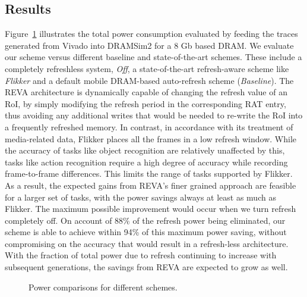 \subsection{Results}
Figure~\ref{fig:PowerResults} illustrates the total power consumption evaluated by feeding the traces generated from Vivado into DRAMSim2 for a 8 Gb based DRAM. We evaluate our scheme versus different baseline and state-of-the-art schemes. These include a completely refreshless system, \emph{Off}, a state-of-the-art refresh-aware scheme like \emph{Flikker} and a default mobile DRAM-based auto-refresh scheme (\emph{Baseline}). %
The REVA architecture is dynamically capable of changing the refresh value of an RoI, by simply modifying the refresh period in the corresponding RAT entry, thus avoiding any additional writes that would be needed to re-write the RoI into a frequently refreshed memory. In contrast, in accordance with its treatment of media-related data, Flikker places all the frames in a low refresh window. While the accuracy of tasks like object recognition are relatively unaffected by this, tasks like action recognition require a high degree of accuracy while recording frame-to-frame differences. 
This limits the range of tasks supported by Flikker. As a result, the expected gains from REVA's finer grained approach are feasible for a larger set of tasks, with the power savings always at least as much as Flikker.
The maximum possible improvement would occur when we turn refresh completely off. On account of 88\% of the refresh power being eliminated, our scheme is able to achieve within 94\% of this maximum power saving, without compromising on the accuracy that would result in a refresh-less architecture. With the fraction of total power due to refresh continuing to increase with subsequent generations, the savings from REVA are expected to grow as well.

\begin{figure}[ht!]
\centering
{}
\caption{\label{fig:PowerResults} Power comparisons for different schemes.}
\vspace{-0.2in}
\end{figure}

